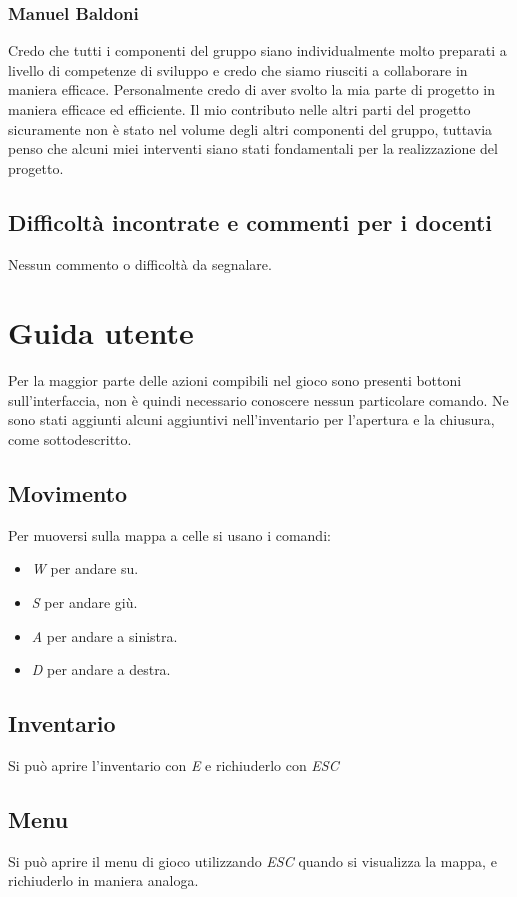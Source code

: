 \documentclass[a4paper,12pt]{report}
\begin{document}
\subsection{Manuel Baldoni}
Credo che tutti i componenti del gruppo siano individualmente molto preparati a livello di competenze di sviluppo e credo che siamo riusciti a collaborare in maniera efficace. Personalmente credo di aver svolto la mia parte di progetto in maniera efficace ed efficiente. Il mio contributo nelle altri parti del progetto sicuramente non è stato nel volume degli altri componenti del gruppo, tuttavia penso che alcuni miei interventi siano stati fondamentali per la realizzazione del progetto.

\section{Difficoltà incontrate e commenti per i docenti}
Nessun commento o difficoltà da segnalare.

\appendix
\chapter{Guida utente}
Per la maggior parte delle azioni compibili nel gioco sono presenti bottoni sull'interfaccia, non è quindi necessario conoscere nessun particolare comando. Ne sono stati aggiunti alcuni aggiuntivi nell'inventario per l'apertura e la chiusura, come sottodescritto.
\section{Movimento}
Per muoversi sulla mappa a celle si usano i comandi:
\begin{itemize}
	\item \textit{W} per andare su.
	\item \textit{S} per andare giù.
	\item \textit{A} per andare a sinistra.
	\item \textit{D} per andare a destra.
\end{itemize}
\section{Inventario}
Si può aprire l'inventario con \textit{E} e richiuderlo con \textit{ESC}
\section{Menu}
Si può aprire il menu di gioco utilizzando \textit{ESC} quando si visualizza la mappa, e richiuderlo in maniera analoga.
\end{document}

